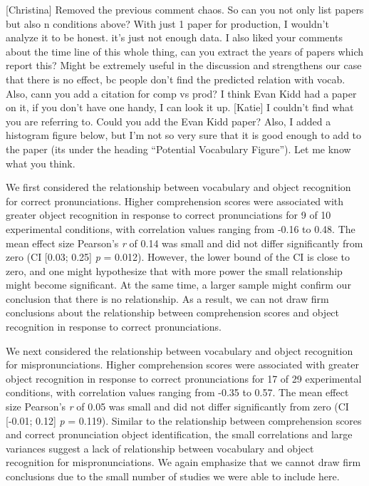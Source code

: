 \documentclass[man]{apa6}
\theoremstyle{definition}
\theoremstyle{definition}
\theoremstyle{definition}
\theoremstyle{remark}
\begin{document}
{[}Christina{]} Removed the previous comment chaos. So can you not only
list papers but also n conditions above? With just 1 paper for
production, I wouldn't analyze it to be honest. it's just not enough
data. I also liked your comments about the time line of this whole
thing, can you extract the years of papers which report this? Might be
extremely useful in the discussion and strengthens our case that there
is no effect, bc people don't find the predicted relation with vocab.
Also, cann you add a citation for comp vs prod? I think Evan Kidd had a
paper on it, if you don't have one handy, I can look it up. {[}Katie{]}
I couldn't find what you are referring to. Could you add the Evan Kidd
paper? Also, I added a histogram figure below, but I'm not so very sure
that it is good enough to add to the paper (its under the heading
\enquote{Potential Vocabulary Figure}). Let me know what you think.

We first considered the relationship between vocabulary and object
recognition for correct pronunciations. Higher comprehension scores were
associated with greater object recognition in response to correct
pronunciations for 9 of 10 experimental conditions, with correlation
values ranging from -0.16 to 0.48. The mean effect size Pearson's
\emph{r} of 0.14 was small and did not differ significantly from zero
(CI {[}0.03; 0.25{]} \emph{p} = 0.012). However, the lower bound of the
CI is close to zero, and one might hypothesize that with more power the
small relationship might become significant. At the same time, a larger
sample might confirm our conclusion that there is no relationship. As a
result, we can not draw firm conclusions about the relationship between
comprehension scores and object recognition in response to correct
pronunciations.

We next considered the relationship between vocabulary and object
recognition for mispronunciations. Higher comprehension scores were
associated with greater object recognition in response to correct
pronunciations for 17 of 29 experimental conditions, with correlation
values ranging from -0.35 to 0.57. The mean effect size Pearson's
\emph{r} of 0.05 was small and did not differ significantly from zero
(CI {[}-0.01; 0.12{]} \emph{p} = 0.119). Similar to the relationship
between comprehension scores and correct pronunciation object
identification, the small correlations and large variances suggest a
lack of relationship between vocabulary and object recognition for
mispronunciations. We again emphasize that we cannot draw firm
conclusions due to the small number of studies we were able to include
here.
\end{document}
